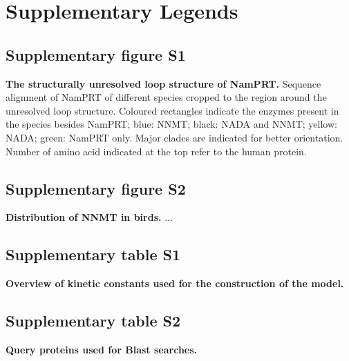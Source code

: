 
\section{Supplementary Legends}

\subsection{Supplementary figure S1}

\textbf{The structurally unresolved loop structure of NamPRT.} Sequence alignment of NamPRT of different species cropped to the region around the unresolved loop structure. Coloured rectangles indicate the enzymes present in the species besides NamPRT; blue: NNMT; black: NADA and NNMT; yellow: NADA; green: NamPRT only. Major clades are indicated for better orientation. Number of amino acid indicated at the top refer to the human protein.


\subsection{Supplementary figure S2}

\textbf{Distribution of NNMT in birds.} ...


\subsection{Supplementary table S1}

\textbf{Overview of kinetic constants used for the construction of the model.}


\subsection{Supplementary table S2}

\textbf{Query proteins used for Blast searches.}
